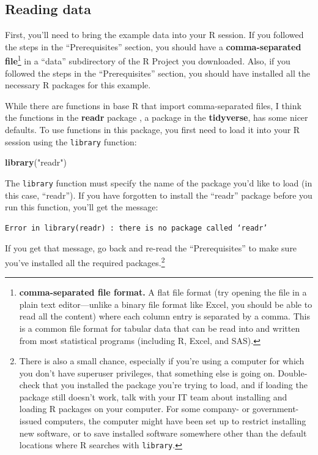 \documentclass[]{tufte-book}
\newenvironment{Shaded}{}{}
\newcommand{\KeywordTok}[1]{\textcolor[rgb]{0.00,0.44,0.13}{\textbf{#1}}}
\newcommand{\NormalTok}[1]{#1}
\newcommand{\StringTok}[1]{\textcolor[rgb]{0.25,0.44,0.63}{#1}}
\begin{document}
\hypertarget{reading-data}{%
\subsection{Reading data}\label{reading-data}}

First, you'll need to bring the example data into your R session. If you followed
the steps in the ``Prerequisites'' section, you should have a
\textbf{comma-separated file}\footnote{\textbf{comma-separated file format.} A flat file format
  (try opening the file in a plain text editor---unlike a binary file format like
  Excel, you should be able to read all the content) where each column entry is
  separated by a comma. This is a common file format for tabular data that can
  be read into and written from most statistical programs (including R, Excel, and
  SAS).} in a ``data'' subdirectory of the R Project you downloaded. Also, if you
followed the steps in the ``Prerequisites'' section, you should have installed
all the necessary R packages for this example.

While there are functions in base R that import comma-separated files, I think the
functions in the \textbf{readr} package \citep{R-readr}, a package in the \textbf{tidyverse},
has some nicer defaults. To use functions in this package, you first need to load
it into your R session using the \texttt{library} function:

\begin{Shaded}
\begin{Highlighting}[]
\KeywordTok{library}\NormalTok{(}\StringTok{"readr"}\NormalTok{)}
\end{Highlighting}
\end{Shaded}

The \texttt{library} function must specify the name of the package you'd like to load (in
this case, ``readr''). If you have forgotten to install the ``readr'' package before you
run this function, you'll get the message:

\begin{verbatim}
Error in library(readr) : there is no package called ‘readr’
\end{verbatim}

If you get that message, go back and re-read the ``Prerequisites'' to make sure you've
installed all the required packages.\footnote{There is also a small chance, especially if
  you're using a computer for which you don't have superuser privileges, that something
  else is going on. Double-check that you installed the package you're trying to load,
  and if loading the package still doesn't work, talk with your IT team about
  installing and loading R packages on your computer. For some company- or
  government-issued computers, the computer might have been set up to restrict
  installing new software, or to save installed software somewhere other than the
  default locations where R searches with \texttt{library}.}
\end{document}
